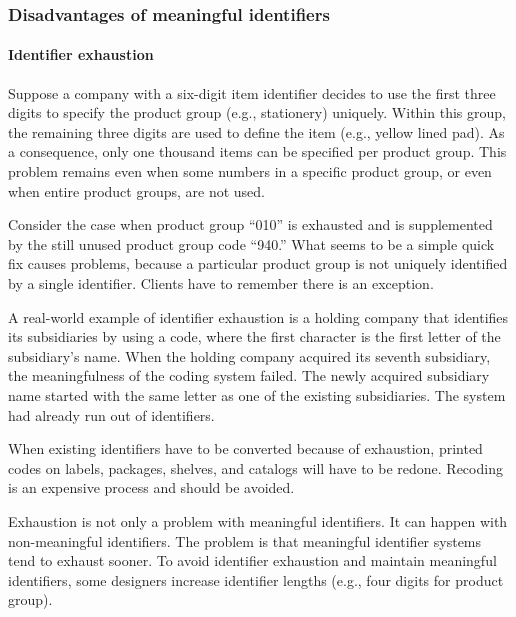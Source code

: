 \documentclass[
]{article}
\begin{document}
\hypertarget{disadvantages-of-meaningful-identifiers}{%
\subsubsection*{Disadvantages of meaningful identifiers}\label{disadvantages-of-meaningful-identifiers}}

\hypertarget{identifier-exhaustion}{%
\paragraph*{Identifier exhaustion}\label{identifier-exhaustion}}

Suppose a company with a six-digit item identifier decides to use the
first three digits to specify the product group (e.g., stationery)
uniquely. Within this group, the remaining three digits are used to
define the item (e.g., yellow lined pad). As a consequence, only one
thousand items can be specified per product group. This problem remains
even when some numbers in a specific product group, or even when entire
product groups, are not used.

Consider the case when product group ``010'' is exhausted and is
supplemented by the still unused product group code ``940.'' What seems to
be a simple quick fix causes problems, because a particular product
group is not uniquely identified by a single identifier. Clients have to
remember there is an exception.

A real-world example of identifier exhaustion is a holding company that
identifies its subsidiaries by using a code, where the first character
is the first letter of the subsidiary's name. When the holding company
acquired its seventh subsidiary, the meaningfulness of the coding system
failed. The newly acquired subsidiary name started with the same letter
as one of the existing subsidiaries. The system had already run out of
identifiers.

When existing identifiers have to be converted because of exhaustion,
printed codes on labels, packages, shelves, and catalogs will have to be
redone. Recoding is an expensive process and should be avoided.

Exhaustion is not only a problem with meaningful identifiers. It can
happen with non-meaningful identifiers. The problem is that meaningful
identifier systems tend to exhaust sooner. To avoid identifier
exhaustion and maintain meaningful identifiers, some designers increase
identifier lengths (e.g., four digits for product group).
\end{document}
